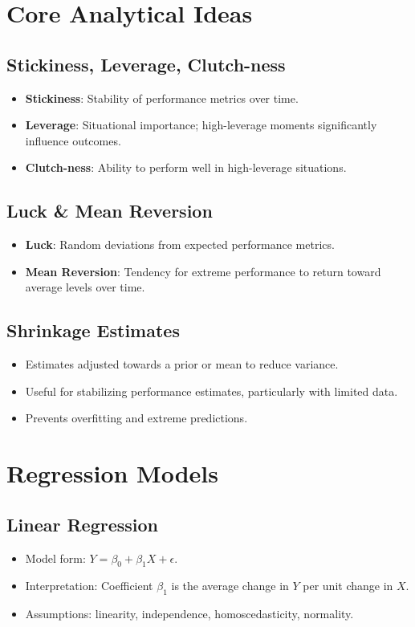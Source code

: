 \documentclass[10pt, landscape]{article}
\begin{document}
\begin{multicols}{3}
\section{Core Analytical Ideas}

\subsection{Stickiness, Leverage, Clutch-ness}
\begin{itemize}[noitemsep]
    \item \textbf{Stickiness}: Stability of performance metrics over time.
    \item \textbf{Leverage}: Situational importance; high-leverage moments significantly influence outcomes.
    \item \textbf{Clutch-ness}: Ability to perform well in high-leverage situations.
\end{itemize}

\subsection{Luck \& Mean Reversion}
\begin{itemize}[noitemsep]
    \item \textbf{Luck}: Random deviations from expected performance metrics.
    \item \textbf{Mean Reversion}: Tendency for extreme performance to return toward average levels over time.
\end{itemize}

\subsection{Shrinkage Estimates}
\begin{itemize}[noitemsep]
    \item Estimates adjusted towards a prior or mean to reduce variance.
    \item Useful for stabilizing performance estimates, particularly with limited data.
    \item Prevents overfitting and extreme predictions.
\end{itemize}

\section{Regression Models}

\subsection{Linear Regression}
\begin{itemize}[noitemsep]
    \item Model form: \( Y = \beta_0 + \beta_1 X + \epsilon \).
    \item Interpretation: Coefficient \(\beta_1\) is the average change in \(Y\) per unit change in \(X\).
    \item Assumptions: linearity, independence, homoscedasticity, normality.
\end{itemize}


\end{multicols}
\end{document}
